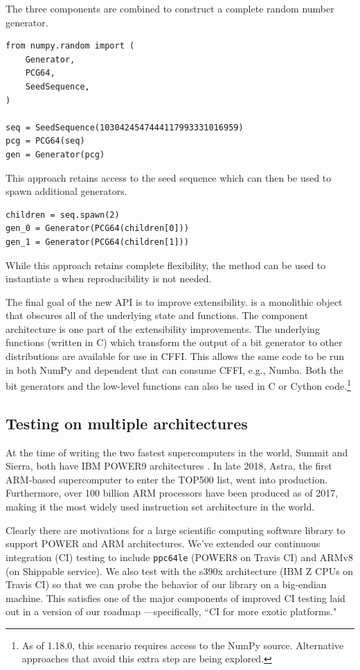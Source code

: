 The three components are combined to construct a complete random number
generator.

\begin{lstlisting}
from numpy.random import (
    Generator,
    PCG64,
    SeedSequence,
)

seq = SeedSequence(1030424547444117993331016959)
pcg = PCG64(seq)
gen = Generator(pcg)
\end{lstlisting}

This approach retains access to the seed sequence which can then be
used to spawn additional generators.

\begin{lstlisting}
children = seq.spawn(2)
gen_0 = Generator(PCG64(children[0]))
gen_1 = Generator(PCG64(children[1]))
\end{lstlisting}

While this approach retains complete flexibility, the method
 can be used to instantiate a  when
reproducibility is not needed.

The final goal of the new API is to improve extensibility.  is
a monolithic object that obscures all of the underlying state and functions. The
component architecture is one part of the extensibility improvements. The
underlying functions (written in C) which transform the output of a bit
generator to other distributions are available for use in CFFI. This allows the
same code to be run in both NumPy and dependent that can consume CFFI, e.g.,
Numba. Both the bit generators and the low-level functions can also be used in C
or Cython code.\footnote{As of 1.18.0, this scenario requires access to the
NumPy source. Alternative approaches that avoid this extra step are being
explored.}

\subsection*{Testing on multiple architectures}

At the time of writing the two fastest supercomputers in the
world, Summit and Sierra, both have IBM POWER9 architectures
\cite{top500nov2019}. In late 2018, Astra, the first ARM-based
supercomputer to enter the TOP500 list, went into production\cite{
astra-wiki}. Furthermore, over 100 billion ARM processors have been
produced as of 2017\cite{arm-architecture}, making it the most 
widely used instruction set architecture in the world.

Clearly there are motivations for a large scientific computing
software library to support POWER and ARM architectures. We've extended
our continuous integration (CI) testing to include \texttt{ppc64le}
(POWER8 on Travis CI) and ARMv8 (on Shippable service). We also test
with the s390x architecture (IBM Z CPUs on Travis CI) so that we
can probe the behavior of our library on a big-endian machine.
This satisfies one of the major components of
improved CI testing laid out in a version of our roadmap
\cite{numpy-roadmap}---specifically, ``CI for more exotic
platforms."

